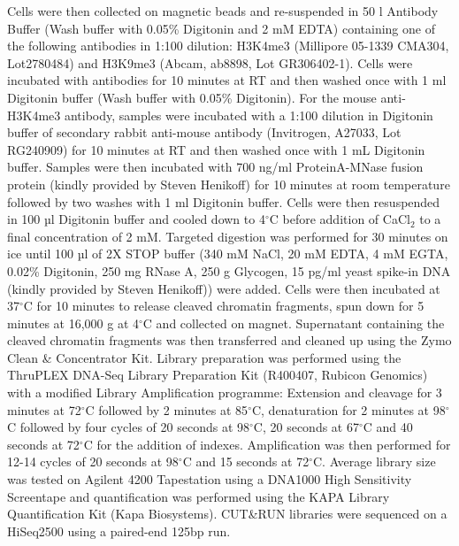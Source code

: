 Cells were then collected on magnetic beads and re-suspended in 50 \textmu{}l Antibody Buffer (Wash buffer with 0.05\% Digitonin and 2 mM EDTA) containing one of the following antibodies in 1:100 dilution: 
H3K4me3 (Millipore 05-1339 CMA304, Lot2780484) and H3K9me3 (Abcam, ab8898, Lot GR306402-1). 
Cells were incubated with antibodies for 10 minutes at RT and then washed once with 1 ml Digitonin buffer (Wash buffer with 0.05\% Digitonin). 
For the mouse anti-H3K4me3 antibody, samples were incubated with a 1:100 dilution in Digitonin buffer of secondary rabbit anti-mouse antibody (Invitrogen, A27033, Lot RG240909) for 10 minutes at RT and then washed once with 1 mL Digitonin buffer. 
Samples were then incubated with 700 ng/ml ProteinA-MNase fusion protein (kindly provided by Steven Henikoff) for 10 minutes at room temperature followed by two washes with 1 ml Digitonin buffer. 
Cells were then resuspended in 100 µl Digitonin buffer and cooled down to 4$^\circ$C before addition of CaCl$_2$ to a final concentration of 2 mM. 
Targeted digestion was performed for 30 minutes on ice until 100 µl of 2X STOP buffer (340 mM NaCl, 20 mM EDTA, 4 mM EGTA, 0.02\% Digitonin, 250 mg RNase A, 250 \textmu{}g Glycogen, 15 pg/ml yeast spike-in DNA (kindly provided by Steven Henikoff)) were added. 
Cells were then incubated at 37$^\circ$C for 10 minutes to release cleaved chromatin fragments, spun down for 5 minutes at 16,000 g at 4$^\circ$C and collected on magnet. 
Supernatant containing the cleaved chromatin fragments was then transferred and cleaned up using the Zymo Clean \& Concentrator Kit.
Library preparation was performed using the ThruPLEX\textsuperscript{\textregistered} DNA-Seq Library Preparation Kit (R400407, Rubicon Genomics) with a modified Library Amplification programme: 
Extension and cleavage for 3 minutes at 72$^\circ$C followed by 2 minutes at 85$^\circ$C, denaturation for 2 minutes at 98$^\circ$C followed by four cycles of 20 seconds at 98$^\circ$C, 20 seconds at 67$^\circ$C and 40 seconds at 72$^\circ$C for the addition of indexes. 
Amplification was then performed for 12-14 cycles of 20 seconds at 98$^\circ$C and 15 seconds at 72$^\circ$C. 
Average library size was tested on Agilent 4200 Tapestation using a DNA1000 High Sensitivity Screentape and quantification was performed using the KAPA Library Quantification Kit (Kapa Biosystems). 
CUT\&{}RUN libraries were sequenced on a HiSeq2500 using a paired-end 125bp run. 


